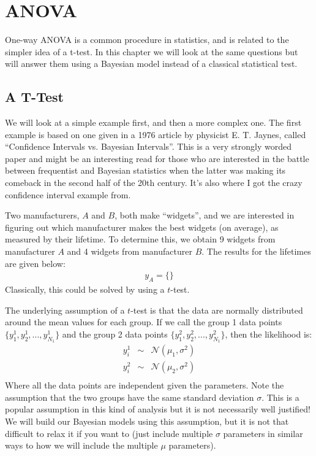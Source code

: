 \chapter{ANOVA}
One-way ANOVA is a common procedure in statistics, and is related to the
simpler idea of a t-test. In this chapter we will look at the same questions
but will answer them using a Bayesian model instead of a classical statistical
test.

\section{A T-Test}
We will look at a simple example first, and then a more complex one.
The first example is based on one given in a 1976 article by physicist E. T. Jaynes,
called ``Confidence Intervals vs. Bayesian Intervals''. This is a very strongly
worded paper and might be an interesting read for
those who are interested in the battle between frequentist and Bayesian statistics
when the latter was making its comeback in the second half of the 20th century.
It's also where I got the crazy confidence interval example from.

Two manufacturers, $A$ and $B$, both make ``widgets'', and we are interested
in figuring out which manufacturer makes the best widgets (on average), as
measured by their lifetime. To determine this, we obtain 9 widgets from
manufacturer $A$ and 4 widgets from manufacturer $B$. The results for the
lifetimes are given below:
\begin{eqnarray}
y_A = \{ \}
\end{eqnarray}
Classically, this could be solved by using a $t$-test.

The underlying assumption of a $t$-test is that the data are normally
distributed around the mean values for each group. If we call the group 1
data points $\{y^1_1, y^1_2, ..., y^1_{N_1}\}$ and the group 2 data points
$\{y^2_1, y^2_2, ..., y^2_{N_1}\}$, then the likelihood is:
\begin{eqnarray}
y^1_i &\sim& \mathcal{N}\left(\mu_1, \sigma^2\right)\\
y^2_i &\sim& \mathcal{N}\left(\mu_2, \sigma^2\right)\\
\end{eqnarray}
Where all the data points are independent given the parameters. Note the assumption that
the two groups have the same standard deviation $\sigma$. This is a popular
assumption in this kind of analysis but it is not necessarily well justified!
We will build our Bayesian models using this assumption, but it is not that
difficult to relax it if you want to (just include multiple $\sigma$ parameters
in similar ways to how we will include the multiple $\mu$ parameters).

